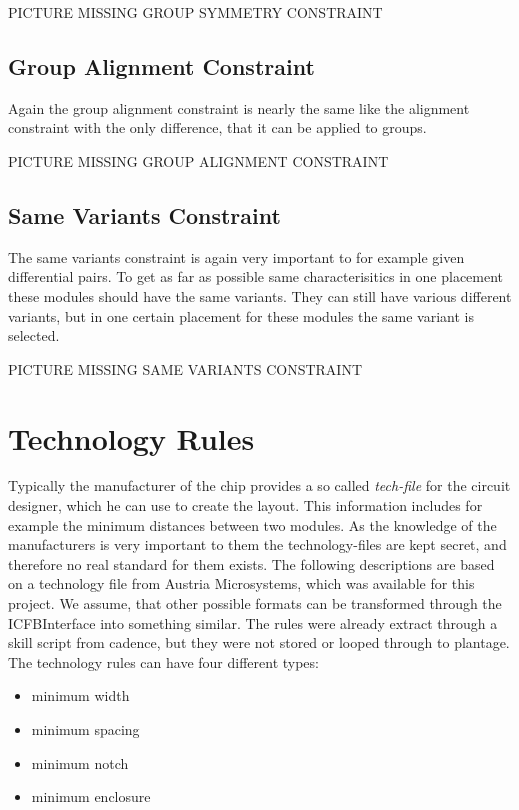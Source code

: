 PICTURE MISSING GROUP SYMMETRY CONSTRAINT

\subsection{Group Alignment Constraint}
Again the group alignment constraint is nearly the same like the alignment constraint with the only difference, that it can be applied to groups.

PICTURE MISSING GROUP ALIGNMENT CONSTRAINT

\subsection{Same Variants Constraint}
The same variants constraint is again very important to for example given differential pairs. To get as far as possible same characterisitics in one placement these modules should have the same variants. They can still have various different variants, but in one certain placement for these modules the same variant is selected.

PICTURE MISSING SAME VARIANTS CONSTRAINT

\section{Technology Rules}
Typically the manufacturer of the chip provides a so called \textit{tech-file} for the circuit designer, which he can use to create the layout. This information includes for example the minimum distances between two modules. As the knowledge of the manufacturers is very important to them the technology-files are kept secret, and therefore no real standard for them exists. The following descriptions are based on a technology file from Austria Microsystems, which was available for this project. We assume, that other possible formats can be transformed through the ICFBInterface into something similar. The rules were already extract through a skill script from cadence, but they were not stored or looped through to plantage. The technology rules can have four different types:

\begin{itemize}
\item minimum width
\item minimum spacing
\item minimum notch
\item minimum enclosure
\end{itemize}

